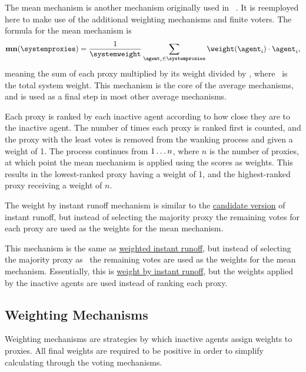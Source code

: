 \label{para:mean}
The mean mechanism is another mechanism originally used in
~\cite{Cohensius2017}.
It is reemployed here to make use of the additional weighting mechanisms and
finite voters.
The formula for the mean mechanism is
\begin{equation*}
    \mathbf{mn}(\systemproxies) =
    \frac{1}{\systemweight}
    \sum_{\agent_i \in \systemproxies} {\weightof{\agent_i} \cdot \agent_i}
    \text{,}\label{eq:mean-mechanism}
\end{equation*}
meaning the sum of each proxy multiplied by its weight divided by
\systemweight, where \systemweight\ is the total system weight.
This mechanism is the core of the average mechanisms, and is used as a final
step in most other average mechanisms.

\label{para:avg-ranked-choice}
Each proxy is ranked by each inactive agent according to how close they are
to the inactive agent.
The number of times each proxy is ranked first is counted, and the proxy with
the least votes is removed from the wanking process and given a weight of 1.
The process continues from $1 \mathellipsis n$, where $n$ is the number of
proxies, at which point the mean mechanism is applied using the scores as
weights.
This results in the lowest-ranked proxy having a weight of 1, and the
highest-ranked proxy receiving a weight of $n$.

\label{para:avg-instant-runoff}
The weight by instant runoff mechanism is similar to the
\hyperref[para:cand-instant-runoff]{candidate version} of instant
runoff, but instead of selecting the majority proxy the remaining votes for
each proxy are used as the weights for the mean mechanism.

\label{para:avg-weighted-instant-runoff}
This mechanism is the same as
\hyperref[para:candidate-weighted-instant-runoff]{weighted instant runoff},
but instead of selecting the majority proxy as \systemtruth\ the remaining votes
are used as the weights for the mean mechanism.
Essentially, this is
\hyperref[para:avg-instant-runoff]{weight by instant runoff}, but the weights
applied by the inactive agents are used instead of ranking each proxy.

\subsection{Weighting Mechanisms}\label{subsec:weighting-mechanisms}
Weighting mechanisms are strategies by which inactive agents assign weights
to proxies.
All final weights are required to be positive in order to simplify
calculating \systemtruth through the voting mechanisms.

